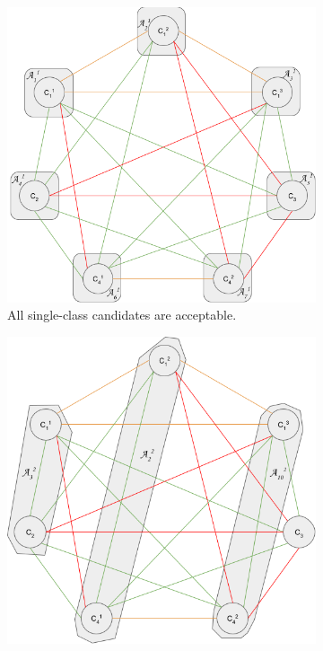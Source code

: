 \begin{figure}[h]
  \label{fig:splittingCtx}
  \def\sfwidth{0.24\textwidth}
  \begin{subfigure}[b]{\sfwidth}
    \includegraphics[width=\textwidth]{img/split-1-class.png}
    \caption{All single-class candidates are acceptable.}
  \end{subfigure}
  \begin{subfigure}[b]{\sfwidth}
    \includegraphics[width=\textwidth]{img/split-2-class_1.png}

\end{subfigure}
\end{figure}
